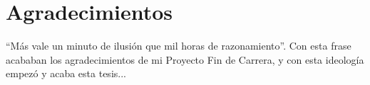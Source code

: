 
\chapter*{Agradecimientos}
\label{cha:agradecimientos}



``Más vale un minuto de ilusión que mil horas de razonamiento''. Con
esta frase acababan los agradecimientos de mi Proyecto Fin de Carrera,
y con esta ideología empezó y acaba esta tesis...


